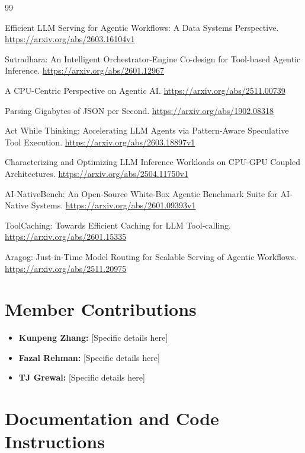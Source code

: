 \documentclass[10pt, letterpaper]{article}
\begin{document}
\begin{thebibliography}{99}

Efficient LLM Serving for Agentic Workflows: A Data Systems Perspective. 
\url{https://arxiv.org/abs/2603.16104v1}

Sutradhara: An Intelligent Orchestrator-Engine Co-design for Tool-based Agentic Inference. 
\url{https://arxiv.org/abs/2601.12967}

A CPU-Centric Perspective on Agentic AI. 
\url{https://arxiv.org/abs/2511.00739}

Parsing Gigabytes of JSON per Second. 
\url{https://arxiv.org/abs/1902.08318}

Act While Thinking: Accelerating LLM Agents via Pattern-Aware Speculative Tool Execution. 
\url{https://arxiv.org/abs/2603.18897v1}

Characterizing and Optimizing LLM Inference Workloads on CPU-GPU Coupled Architectures. 
\url{https://arxiv.org/abs/2504.11750v1}

AI-NativeBench: An Open-Source White-Box Agentic Benchmark Suite for AI-Native Systems. 
\url{https://arxiv.org/abs/2601.09393v1}

ToolCaching: Towards Efficient Caching for LLM Tool-calling. 
\url{https://arxiv.org/abs/2601.15335}

Aragog: Just-in-Time Model Routing for Scalable Serving of Agentic Workflows. 
\url{https://arxiv.org/abs/2511.20975}

\end{thebibliography}

\clearpage

\appendix

\section{Member Contributions}
\begin{itemize}
    \item \textbf{Kunpeng Zhang:} [Specific details here]
    \item \textbf{Fazal Rehman:} [Specific details here]
    \item \textbf{TJ Grewal:} [Specific details here]
\end{itemize}

\section{Documentation and Code Instructions}
\end{document}
